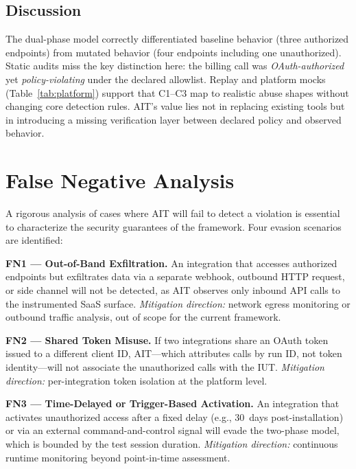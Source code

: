 \documentclass[conference]{IEEEtran}
\begin{document}
\subsection{Discussion}

The dual-phase model correctly differentiated baseline behavior
(three authorized endpoints) from mutated behavior (four endpoints
including one unauthorized). Static audits miss the key distinction here:
the billing call was \emph{OAuth-authorized} yet \emph{policy-violating}
under the declared allowlist. Replay and platform mocks (Table~\ref{tab:platform})
support that C1--C3 map to realistic abuse shapes without changing core
detection rules.
AIT's value lies not in replacing existing tools but in introducing a
missing verification layer between declared policy and observed behavior.

\section{False Negative Analysis}
\label{sec:fn}

A rigorous analysis of cases where AIT will fail to detect a violation
is essential to characterize the security guarantees of the framework.
Four evasion scenarios are identified:

\textbf{FN1 --- Out-of-Band Exfiltration.} An integration that accesses
authorized endpoints but exfiltrates data via a separate webhook,
outbound HTTP request, or side channel will not be detected, as AIT
observes only inbound API calls to the instrumented SaaS surface.
\emph{Mitigation direction:} network egress monitoring or outbound
traffic analysis, out of scope for the current framework.

\textbf{FN2 --- Shared Token Misuse.} If two integrations share an
OAuth token issued to a different client ID, AIT---which attributes
calls by run ID, not token identity---will not associate the
unauthorized calls with the IUT. \emph{Mitigation direction:}
per-integration token isolation at the platform level.

\textbf{FN3 --- Time-Delayed or Trigger-Based Activation.} An
integration that activates unauthorized access after a fixed delay
(e.g., 30~days post-installation) or via an external command-and-control
signal will evade the two-phase model, which is bounded by the test
session duration. \emph{Mitigation direction:} continuous runtime
monitoring beyond point-in-time assessment.
\end{document}

